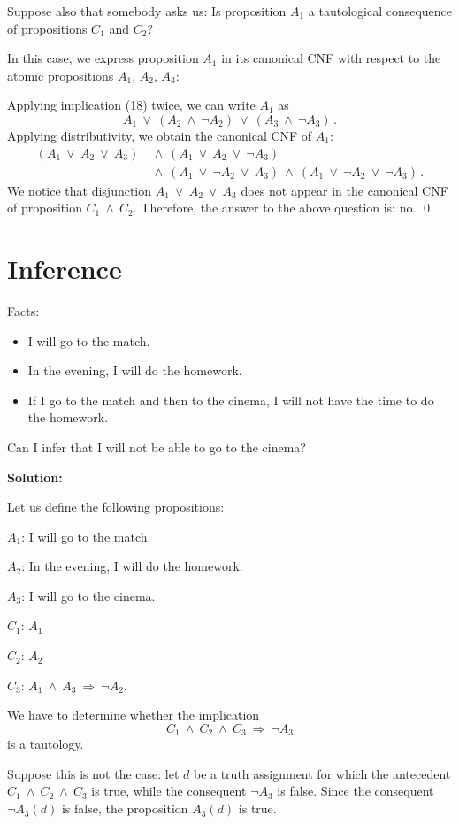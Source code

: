 \documentclass[11pt,paper=b5,footinclude,headinclude]{scrbook} %
\def\ali {{~\vee~}}
\def\inn {{~\wedge~}}
\def\sledi {{~\Rightarrow~}}
\theoremstyle{remark}
\theoremstyle{definition} %
\theoremstyle{theorem} %
\begin{document}
\bigskip

Suppose also that somebody asks us: Is proposition $A_1$ a tautological consequence of propositions $C_1$ and $C_2$?

In this case, we express proposition $A_1$ in its canonical CNF with respect to the atomic propositions $A_1$, $A_2$, $A_3$:

Applying implication (18) twice, we can write $A_1$ as
$$A_1\ali (A_2\inn \neg A_2)\ali (A_3\inn \neg A_3)\,.$$
Applying distributivity, we obtain the canonical CNF of $A_1$:
\begin{align*}
    (A_1\ali A_2\ali A_3)
    & \inn (A_1\ali A_2\ali \neg A_3)\\
    & \inn (A_1\ali \neg A_2\ali A_3)
    \inn (A_1\ali \neg A_2\ali \neg A_3)\,.
\end{align*}
We notice that disjunction $A_1\ali A_2\ali A_3$ does not appear in the canonical CNF of proposition $C_1\inn C_2$.
Therefore, the answer to the above question is: no. \qed


\section{Inference}

Facts:
\begin{itemize}
  \item I will go to the match.
  \item In the evening, I will do the homework.
  \item If I go to the match and then to the cinema, I will not have the time to do the homework.
\end{itemize}
Can I infer that I will not be able to go to the cinema?

\medskip
\textbf{ Solution:}

Let us define the following propositions:

$A_1$: I will go to the match.

$A_2$: In the evening, I will do the homework.

$A_3$: I will go to the cinema.

$C_1$: $A_1$

$C_2$: $A_2$

$C_3$: $A_1\inn A_3\sledi \neg A_2$.

We have to determine whether the implication
$$C_1\inn C_2\inn C_3\sledi \neg A_3$$
is a tautology.


Suppose this is not the case: let $d$ be a truth assignment for which the antecedent
$C_1\inn C_2\inn C_3$ is true,
while the consequent $\neg A_3$ is false.
Since the consequent $\neg A_3(d)$ is false, the proposition $A_3(d)$ is true.
\end{document}
